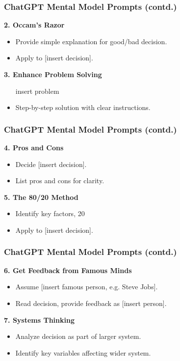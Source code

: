 \begin{frame}[fragile]\frametitle{ChatGPT Mental Model Prompts (contd.)}
\textbf{2. Occam's Razor}
\begin{itemize}
    \item Provide simple explanation for good/bad decision.
    \item Apply to [insert decision].
\end{itemize}

\textbf{3. Enhance Problem Solving}
\begin{itemize}
    \item [insert problem]
    \item Step-by-step solution with clear instructions.
\end{itemize}
\end{frame}

\begin{frame}[fragile]\frametitle{ChatGPT Mental Model Prompts (contd.)}
\textbf{4. Pros and Cons}
\begin{itemize}
    \item Decide [insert decision].
    \item List pros and cons for clarity.
\end{itemize}

\textbf{5. The 80/20 Method}
\begin{itemize}
    \item Identify key factors, 20%
    \item Apply to [insert decision].
\end{itemize}
\end{frame}

\begin{frame}[fragile]\frametitle{ChatGPT Mental Model Prompts (contd.)}
\textbf{6. Get Feedback from Famous Minds}
\begin{itemize}
    \item Assume [insert famous person, e.g. Steve Jobs].
    \item Read decision, provide feedback as [insert person].
\end{itemize}

\textbf{7. Systems Thinking}
\begin{itemize}
    \item Analyze decision as part of larger system.
    \item Identify key variables affecting wider system.
\end{itemize}
\end{frame}

